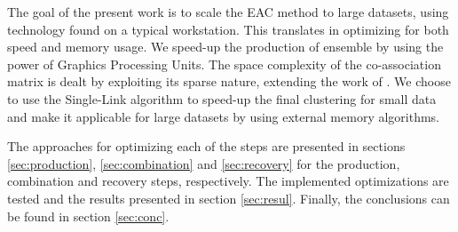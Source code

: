 The goal of the present work is to scale the EAC method to large datasets, using technology found on a typical workstation.
This translates in optimizing for both speed and memory usage.
We speed-up the production of ensemble by using the power of Graphics Processing Units.
The space complexity of the co-association matrix is dealt by exploiting its sparse nature, extending the work of \cite{Lourenco2010}.
We choose to use the Single-Link algorithm to speed-up the final clustering for small data and make it applicable for large datasets by using external memory algorithms.

The approaches for optimizing each of the steps are presented in sections \ref{sec:production}, \ref{sec:combination} and \ref{sec:recovery} for the production, combination and recovery steps, respectively.
The implemented optimizations are tested and the results presented in section \ref{sec:resul}.
Finally, the conclusions can be found in section \ref{sec:conc}.